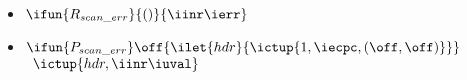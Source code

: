 {\begin{itemize}
\item $\ifun {R_{scan\_err}} {()} {\iinr \ierr}$
\item $\ifun {P_{scan\_err}} \off {\ilet {hdr} {\ictup{1,\iecpc,(\off,\off)}}}$\\
  \verb+ +$\ictup{hdr,\iinr \iuval}$
\end{itemize}
}


\begin{figure*}
\small
{} 


\end{figure*}
